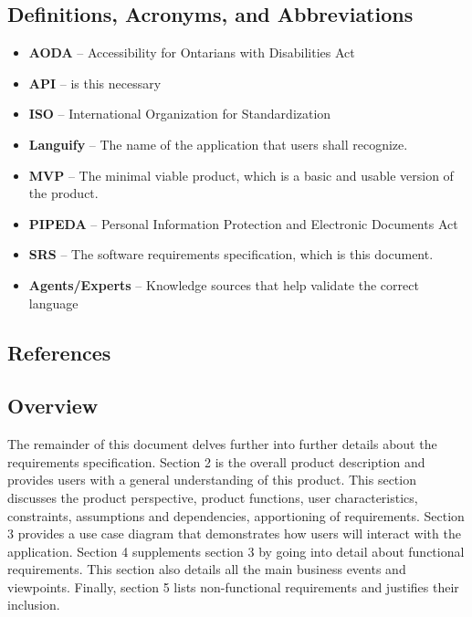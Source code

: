 \subsection{Definitions, Acronyms, and Abbreviations}
\label{sub:definitions_acronyms_and_abbreviations}
\begin{itemize}
	\item \textbf{AODA} – Accessibility for Ontarians with Disabilities Act
	\item \textbf{API} – is this necessary
	\item \textbf{ISO} – International Organization for Standardization
	\item \textbf{Languify} – The name of the application that users shall recognize.
	\item \textbf{MVP} – The minimal viable product, which is a basic and usable version of the product. 
	\item \textbf{PIPEDA} – Personal Information Protection and Electronic Documents Act
	\item \textbf{SRS} – The software requirements specification, which is this document.
	\item \textbf{Agents/Experts} – Knowledge sources that help validate the correct language
\end{itemize}


\subsection{References}
\label{sub:references}
% 
% 


\subsection{Overview}
\label{sub:overview}
The remainder of this document delves further into further details about the requirements specification. Section 2 is the overall product description and provides users with a general understanding of this product. This section discusses the product perspective, product functions, user characteristics, constraints, assumptions and dependencies, apportioning of requirements. Section 3 provides a use case diagram that demonstrates how users will interact with the application. Section 4 supplements section 3 by going into detail about functional requirements. This section also details all the main business events and viewpoints. Finally, section 5 lists non-functional requirements and justifies their inclusion.

